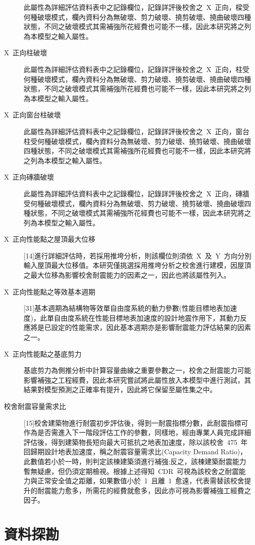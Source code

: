\begin{description}
  此屬性為詳細評估資料表中之記錄欄位，記錄詳評後校舍之~X~正向，樑受何種破壞模式，欄內資料分為無破壞、剪力破壞、撓剪破壞、撓曲破壞四種狀態，不同之破壞模式其需補強所花經費也可能不一樣，因此本研究將之列為本模型之輸入屬性。
  \item[X~正向柱破壞]
  此屬性為詳細評估資料表中之記錄欄位，記錄詳評後校舍之~X~正向，柱受何種破壞模式，欄內資料分為無破壞、剪力破壞、撓剪破壞、撓曲破壞四種狀態，不同之破壞模式其需補強所花經費也可能不一樣，因此本研究將之列為本模型之輸入屬性。
  \item[X~正向窗台柱破壞]
  此屬性為詳細評估資料表中之記錄欄位，記錄詳評後校舍之~X~正向，窗台柱受何種破壞模式，欄內資料分為無破壞、剪力破壞、撓剪破壞、撓曲破壞四種狀態，不同之破壞模式其需補強所花經費也可能不一樣，因此本研究將之列為本模型之輸入屬性。
  \item[X~正向磚牆破壞]
  此屬性為詳細評估資料表中之記錄欄位，記錄詳評後校舍之~X~正向，磚牆受何種破壞模式，欄內資料分為無破壞、剪力破壞、撓剪破壞、撓曲破壞四種狀態，不同之破壞模式其需補強所花經費也可能不一樣，因此本研究將之列為本模型之輸入屬性。
  \item[X~正向性能點之屋頂最大位移]
  [14]進行詳細評估時，若採用推垮分析，則該欄位則須依~X~及~Y~方向分別輸入屋頂最大位移值。本研究僅挑選採用推垮分析之校舍進行建模，因屋頂之最大位移為影響校舍耐震能力的因素之一，因此也將該屬性列入。
  \item[X~正向性能點之等效基本週期]
  [31]基本週期為結構物等效單自由度系統的動力參數(性能目標地表加速度)，此單自由度系統在性能目標地表加速度的設計地震作用下，其動力反應將是已設定的性能需求，因此基本週期亦是影響耐震能力評估結果的因素之一。
  \item[X~正向性能點之基底剪力]
  基底剪力為側推分析中計算容量曲線之重要參數之一，校舍之耐震能力可能影響補強之工程經費，因此本研究嘗試將此屬性放入本模型中進行測試，其結果對模型預測之正確率有提升，因此將它保留至屬性集之中。
  \item[校舍耐震容量需求比]
  [15]校舍建築物進行耐震初步評估後，得到一耐震指標分數，此耐震指標可作為是否需進入下一階段評估工作的參數，同樣地，經由專業人員完成詳細評估後，得到建築物長短向最大可抵抗之地表加速度，除以該校舍~475~年回歸期設計地表加速度，稱之耐震容量需求比(Capacity Demand Ratio)，此數值若小於一時，則判定該棟建築須進行補強;反之，該棟建築耐震能力暫無疑慮，但仍須定期檢視。根據上述得知~CDR~可視為該校舍之耐震能力與正常安全值之距離，如果數值小於~1~且離~1~愈遠，代表需替該校舍提升的耐震能力愈多，所需花的經費就愈多，因此亦可視為影響補強工經費之因子。
\end{description}

\section{資料探勘}

